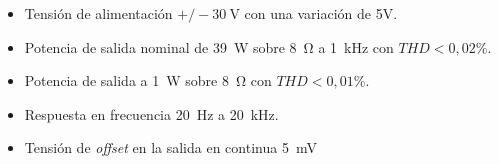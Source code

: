 

\begin{itemize}
	\item Tensión de alimentación $+/- \SI{30}{\volt}$ con una variación de 5V.
	\item Potencia de salida nominal de \SI{39}{\watt} sobre \SI{8}{\ohm} a \SI{1}{\kilo\hertz} con $THD<0,02\%$.
	\item Potencia de salida a \SI{1}{\watt} sobre \SI{8}{\ohm} con $THD<0,01\%$. 
	\item Respuesta en frecuencia \SI{20}{\hertz} a \SI{20}{\kilo\hertz}.
	\item Tensión de \textit{offset} en la salida en continua \SI{5}{\milli\volt}
\end{itemize}